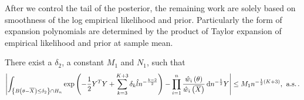 After we control the tail of the posterior, the remaining work are
solely based on smoothness of the log empirical likelihood and prior.
Particularly the form of expansion polynomials are determined by the
product of Taylor expansion of empirical likelihood and prior at sample
mean. 
\begin{lem}
\label{lem:central-expansion-llik}%
\begin{comment}
need condition
\end{comment}
There exist a $\delta_{2}$, a constant $M_{1}$ and $N_{1}$, such
that 
\[
\left|\int_{\left\{ B\left(\theta-\overline{X}\right)\le\delta_{2}\right\} \cap H_{n}}\exp\left(-\frac{1}{2}Y^{T}Y+\sum_{k=3}^{K+3}\delta_{k}\hat{l}n^{-\frac{k-2}{2}}\right)-\prod_{i=1}^{n}\frac{\hat{w}_{i}\left(\theta\right)}{\hat{w}_{i}\left(\overline{X}\right)}\,\mathrm{d} n^{-\frac{1}{2}}Y\right|\le M_{1}n^{-\frac{1}{2}\left(K+3\right)},\:\,\mathrm{a.s.}\,.
\]
\end{lem}
